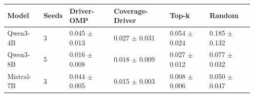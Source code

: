 \begin{tabular}{llllll}
\toprule
Model & Seeds & Driver-OMP & Coverage-Driver & Top-k & Random \\
\midrule
Qwen3-4B & 3 & 0.045 $\pm$ 0.013 & 0.027 $\pm$ 0.031 & 0.054 $\pm$ 0.024 & 0.185 $\pm$ 0.132 \\
Qwen3-8B & 5 & 0.016 $\pm$ 0.008 & 0.018 $\pm$ 0.009 & 0.027 $\pm$ 0.012 & 0.077 $\pm$ 0.032 \\
Mistral-7B & 3 & 0.044 $\pm$ 0.005 & 0.015 $\pm$ 0.003 & 0.008 $\pm$ 0.006 & 0.050 $\pm$ 0.047 \\
\bottomrule
\end{tabular}
